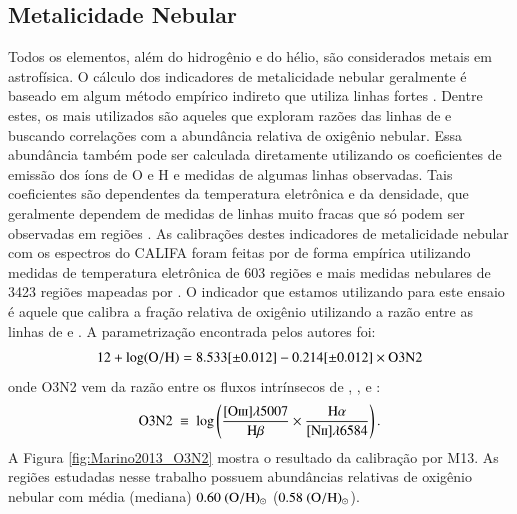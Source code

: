 \subsection{Metalicidade Nebular}
\label{apendice:EmLinesDataCube:props:Zneb}
Todos os elementos, além do hidrogênio e do hélio, são considerados metais em astrofísica. O cálculo dos indicadores de metalicidade nebular geralmente é baseado em algum método empírico indireto que utiliza linhas fortes \citep[\emph{strong-line methods}; ][]{Pagel.etal.1979a}. Dentre estes, os mais utilizados são aqueles que exploram razões das linhas de \Oiii e \Nii buscando correlações com a abundância relativa de oxigênio nebular. Essa abundância também pode ser calculada diretamente utilizando os coeficientes de emissão dos íons de O e H e medidas de algumas linhas observadas. Tais coeficientes são dependentes da temperatura eletrônica e da densidade, que geralmente dependem de medidas de linhas muito fracas que só podem ser observadas em regiões \Hii. As calibrações destes indicadores de metalicidade nebular com os espectros do CALIFA foram feitas por \citet{Marino.etal.2013a} de forma empírica utilizando medidas de temperatura eletrônica de 603 regiões \Hii e mais medidas nebulares de 3423 regiões \Hii mapeadas por \citet{Sanchez.etal.2013a}. O indicador que estamos utilizando para este ensaio é aquele que calibra a fração relativa de oxigênio utilizando a razão entre as linhas de \oiii e \nii. A
parametrização encontrada pelos autores foi:
\begin{equation}
	12 + \log ({\rm O}/{\rm H}) = 8.533[\pm0.012] - 0.214[\pm0.012]\times \textrm{O3N2}
\end{equation}
\noindent onde O3N2 vem da razão entre os fluxos intrínsecos de \oiii, \Hb, \nii e \Ha:
\begin{equation}
	\textrm{O3N2}\ \equiv\ \log \left(\frac{\OIII}{\Hb} \times \frac{\Ha}{\NII}\right).
\end{equation}
A Figura \ref{fig:Marino2013_O3N2} mostra o resultado da calibração por M13. As regiões estudadas nesse trabalho possuem abundâncias relativas de oxigênio nebular com média (mediana) $0.60\ ({\rm O}/{\rm H})_\odot$ ($0.58\ ({\rm O}/{\rm H})_\odot$).

